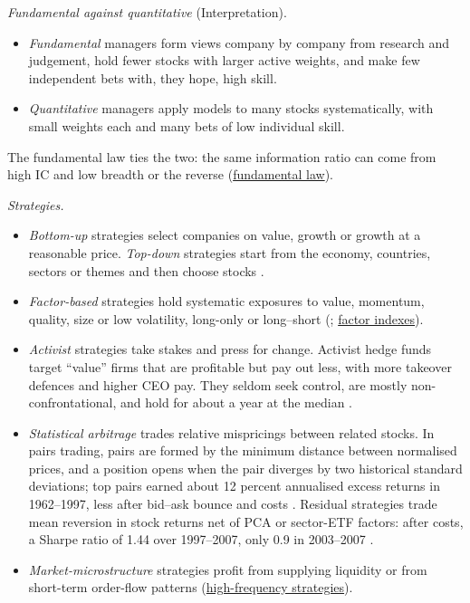 \begin{qfdefinition}\label{def:active-equity-strategies}
 \emph{Fundamental against quantitative} (Interpretation).
\begin{itemize}
\item \emph{Fundamental} managers form views company by company from research and judgement, hold fewer stocks with larger active weights, and make few independent bets with, they hope, high skill.
\item \emph{Quantitative} managers apply models to many stocks systematically, with small weights each and many bets of low individual skill.
\end{itemize}
The fundamental law ties the two: the same information ratio can come from high IC and low breadth or the reverse (\hyperref[res:fundamental-law-active-management]{fundamental law}).

\emph{Strategies.}
\begin{itemize}
\item \emph{Bottom-up} strategies select companies on value, growth or growth at a reasonable price. \emph{Top-down} strategies start from the economy, countries, sectors or themes and then choose stocks \citep[chap.~7, secs.~5.1.1--5.1.3 and~9.1, pp.~432--436 and~474]{managing-investment-portfolios-2007}.
\item \emph{Factor-based} strategies hold systematic exposures to value, momentum, quality, size or low volatility, long-only or long--short (\citep[chap.~14, pp.~449--451]{s7-ang}; \hyperref[def:cap-weighted-factor-indexing]{factor indexes}).
\item \emph{Activist} strategies take stakes and press for change. Activist hedge funds target ``value'' firms that are profitable but pay out less, with more takeover defences and higher CEO pay. They seldom seek control, are mostly non-confrontational, and hold for about a year at the median \citep[pp.~1729--1731]{wide-brav-activism}.
\item \emph{Statistical arbitrage} trades relative mispricings between related stocks. In pairs trading, pairs are formed by the minimum distance between normalised prices, and a position opens when the pair diverges by two historical standard deviations; top pairs earned about 12 percent annualised excess returns in 1962--1997, less after bid--ask bounce and costs \citep[secs.~I and~III, pp.~1--8]{gatev-pairs-trading-1999}. Residual strategies trade mean reversion in stock returns net of PCA or sector-ETF factors: after costs, a Sharpe ratio of 1.44 over 1997--2007, only 0.9 in 2003--2007 \citep[abstract]{avellaneda-lee-statarb-2009}.
\item \emph{Market-microstructure} strategies profit from supplying liquidity or from short-term order-flow patterns (\hyperref[def:hft-strategies]{high-frequency strategies}).
\end{itemize}


\end{qfdefinition}
